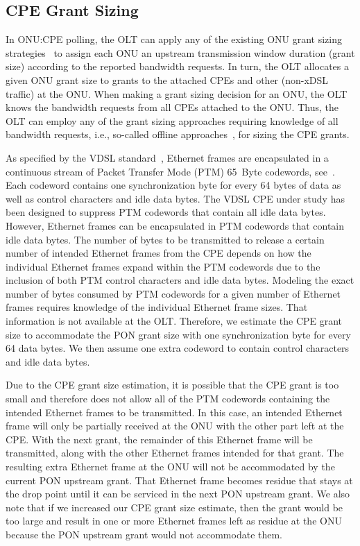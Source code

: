 \documentclass[pdftex,journal]{IEEEtran}
\begin{document}
\subsection{CPE Grant Sizing} \label{cpesize:sec}
In ONU:CPE polling, the OLT can apply any of the existing ONU grant
sizing strategies~\cite{KMP0202,ZM0709,MR0712} to assign each ONU an upstream
transmission window duration (grant size) according to the reported
bandwidth requests.
In turn, the OLT allocates a given ONU grant size to grants to the
attached CPEs and other (non-xDSL traffic) at the ONU.
When making a grant sizing decision for an ONU, the OLT knows the
bandwidth requests from all CPEs attached to the ONU.
Thus, the OLT can employ any of the grant sizing approaches requiring
knowledge of all bandwidth requests,
i.e., so-called offline approaches~\cite{ZM0709,MR0712},
for sizing the CPE grants.

As specified by the VDSL standard~\cite{VDSL}, Ethernet frames are
encapsulated in a continuous stream of Packet Transfer Mode (PTM) 65~Byte
codewords, see~\cite[Annex N]{ADSL}. Each codeword
contains one synchronization byte for every 64 bytes of data as well
as control characters and idle data bytes. The VDSL CPE under study
has been designed to suppress PTM codewords that contain all idle
data bytes. However, Ethernet frames can be encapsulated in PTM codewords
that contain idle data bytes. The number of bytes to be transmitted to
release a certain number of intended Ethernet frames from the CPE
depends on how the individual Ethernet frames expand within the PTM
codewords due to the inclusion of both PTM control characters and idle
data bytes. Modeling the exact number of bytes consumed by PTM codewords for
a given number of Ethernet frames requires knowledge of the individual
Ethernet frame sizes.  That information is not available at the
OLT. Therefore, we estimate the CPE grant size to accommodate the PON
grant size with one synchronization byte for every 64 data bytes. We
then assume one extra codeword to contain control characters and idle
data bytes.

Due to the CPE grant size estimation, it is possible
that the CPE grant is too small and therefore does not allow all of
the PTM codewords containing the intended Ethernet frames to be
transmitted. In this case, an intended Ethernet frame will only be
partially received at the ONU with the other part left at the CPE. With
the next grant, the remainder of this Ethernet frame will be
transmitted, along with the other Ethernet frames intended for that
grant. The resulting extra Ethernet frame at the ONU will not
be accommodated by the current PON upstream grant. That Ethernet frame becomes
residue that stays at the drop point until it can be serviced in the next PON
upstream grant.
We also note that if we increased our CPE grant size estimate,
then the grant would be
too large and result in one or more Ethernet frames left as residue at
the ONU because the PON upstream grant would not accommodate them.
\end{document}
